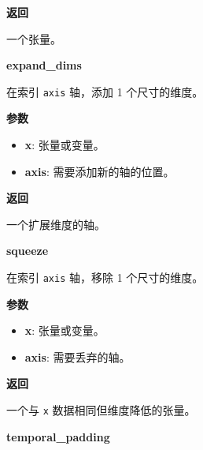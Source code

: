 \textbf{返回}

一个张量。


\textbf{expand\_dims}\label{expandux5fdims}

\begin{Shaded}
\begin{Highlighting}[]
\OperatorTok{=-}\NormalTok{)}
\end{Highlighting}
\end{Shaded}

在索引 \texttt{axis} 轴，添加 1 个尺寸的维度。

\textbf{参数}

\begin{itemize}
\tightlist
\item
  \textbf{x}: 张量或变量。
\item
  \textbf{axis}: 需要添加新的轴的位置。
\end{itemize}

\textbf{返回}

一个扩展维度的轴。


\textbf{squeeze}\label{squeeze}

\begin{Shaded}
\begin{Highlighting}[]
\end{Highlighting}
\end{Shaded}

在索引 \texttt{axis} 轴，移除 1 个尺寸的维度。

\textbf{参数}

\begin{itemize}
\tightlist
\item
  \textbf{x}: 张量或变量。
\item
  \textbf{axis}: 需要丢弃的轴。
\end{itemize}

\textbf{返回}

一个与 \texttt{x} 数据相同但维度降低的张量。


\textbf{temporal\_padding}\label{temporalux5fpadding}

\begin{Shaded}
\begin{Highlighting}[]
\OperatorTok{=}\NormalTok{(}\NormalTok{, }\NormalTok{))}
\end{Highlighting}
\end{Shaded}

